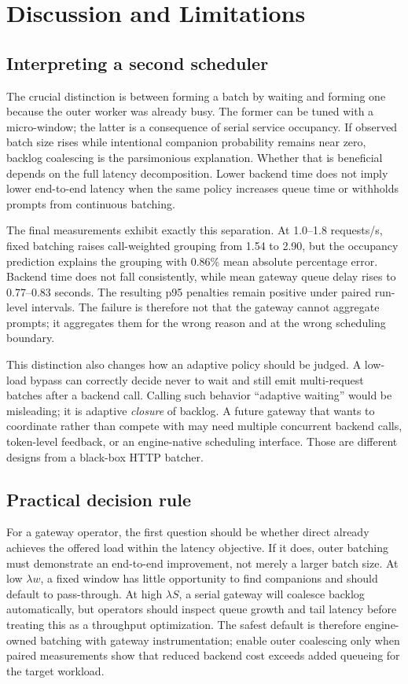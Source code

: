 \section{Discussion and Limitations}
\label{sec:discussion}

\subsection{Interpreting a second scheduler}

The crucial distinction is between forming a batch by waiting and forming one
because the outer worker was already busy. The former can be tuned with a
micro-window; the latter is a consequence of serial service occupancy. If
observed batch size rises while intentional companion probability remains near
zero, backlog coalescing is the parsimonious explanation. Whether that is
beneficial depends on the full latency decomposition. Lower backend time does
not imply lower end-to-end latency when the same policy increases queue time or
withholds prompts from continuous batching.

The final measurements exhibit exactly this separation. At 1.0--1.8
requests/s, fixed batching raises call-weighted grouping from 1.54 to 2.90,
but the occupancy prediction explains the grouping with 0.86\% mean absolute
percentage error. Backend time does not fall consistently, while mean gateway
queue delay rises to 0.77--0.83 seconds. The resulting p95 penalties remain
positive under paired run-level intervals. The failure is therefore not that
the gateway cannot aggregate prompts; it aggregates them for the wrong reason
and at the wrong scheduling boundary.

This distinction also changes how an adaptive policy should be judged. A
low-load bypass can correctly decide never to wait and still emit multi-request
batches after a backend call. Calling such behavior ``adaptive waiting'' would
be misleading; it is adaptive \emph{closure} of backlog. A future gateway that
wants to coordinate rather than compete with \vllm{} may need multiple
concurrent backend calls, token-level feedback, or an engine-native scheduling
interface. Those are different designs from a black-box HTTP batcher.

\subsection{Practical decision rule}

For a gateway operator, the first question should be whether direct \vllm{}
already achieves the offered load within the latency objective. If it does,
outer batching must demonstrate an end-to-end improvement, not merely a larger
batch size. At low $\lambda w$, a fixed window has little opportunity to find
companions and should default to pass-through. At high $\lambda S$, a serial
gateway will coalesce backlog automatically, but operators should inspect queue
growth and tail latency before treating this as a throughput optimization.
The safest default is therefore engine-owned batching with gateway
instrumentation; enable outer coalescing only when paired measurements show
that reduced backend cost exceeds added queueing for the target workload.

